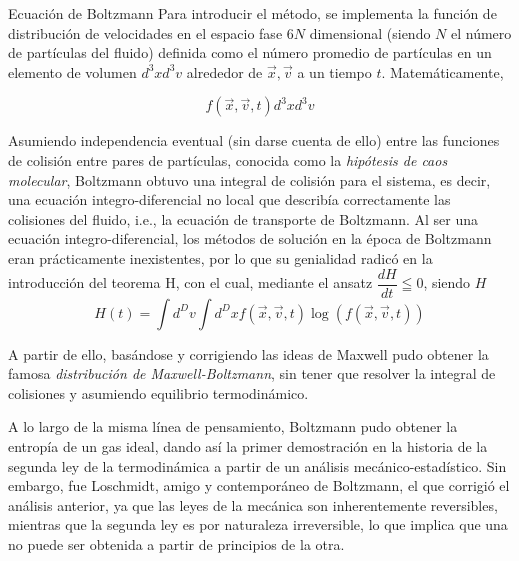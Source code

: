 \documentclass[12pt]{article}
\begin{document}
 \begin {section} {Ecuación de Boltzmann}
 Para introducir el método, se implementa la función de distribución de velocidades en el espacio fase $6N$ dimensional (siendo $N$ el número de partículas del fluido) definida como el número promedio de partículas en un elemento de volumen $d^3xd^3v$ alrededor de $\Vec{x}, \Vec{v}$ a un tiempo $t$. Matemáticamente, 

\begin {equation}
	f(\Vec{x},\Vec{v},t)d^3xd^3v
\end {equation}

Asumiendo independencia eventual (sin darse cuenta de ello) entre las funciones de colisión entre pares de partículas, conocida como la \textit{hipótesis de caos molecular}, Boltzmann obtuvo una integral de colisión para el sistema, es decir, una ecuación integro-diferencial no local que describía correctamente las colisiones del fluido, i.e., la ecuación de transporte de Boltzmann. 
Al ser una ecuación integro-diferencial, los métodos de solución en la época de Boltzmann eran prácticamente inexistentes, por lo que su genialidad radicó en la introducción del teorema H, con el cual, mediante el ansatz $\dfrac{dH}{dt}\leqq 0 $, siendo $H$
\begin {equation*}
H (t) = \int {d^{D}v\int {d^{D}x f (\Vec{x}, \Vec{v}, t)\log{\left(f (\Vec{x}, \Vec{v}, t)\right)}}}
\end {equation*}

A partir de ello, basándose y corrigiendo las ideas de Maxwell pudo obtener la famosa \textit{distribución de Maxwell-Boltzmann}, sin tener que resolver la integral de colisiones y asumiendo equilibrio termodinámico.

A lo largo de la misma línea de pensamiento, Boltzmann pudo obtener la entropía de un gas ideal, dando así la primer demostración en la historia de la segunda ley de la termodinámica a partir de un análisis mecánico-estadístico. Sin embargo, fue Loschmidt, amigo y contemporáneo de Boltzmann, el que corrigió el análisis anterior, ya que las leyes de la mecánica son inherentemente reversibles, mientras que la segunda ley es por naturaleza irreversible, lo que implica que una no puede ser obtenida a partir de principios de la otra. 
\end {section}
\end{document}
